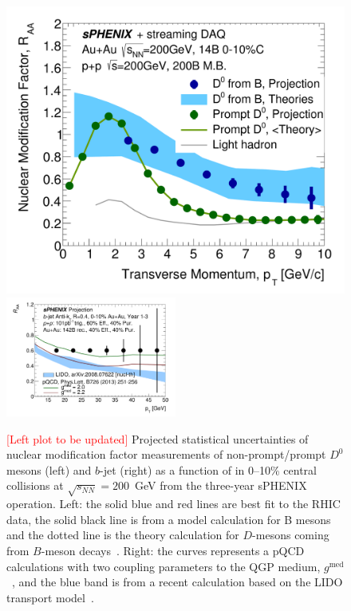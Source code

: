 \begin{figure}[htbp]
\centering
\includegraphics[width=.49\linewidth]{figs/RAA_DB_theory_root_RAADB_pp200B.pdf}
\includegraphics[width=0.5\textwidth]{figs/200pp_pythia8_CTEQ6L_7GeV_ALL_cfg_eneg_DSTReader_root_Draw_HFJetTruth_CrossSection2RAA_Theory_3yr_deta0_70.pdf}
\caption{{\textcolor{red}{[Left plot to be updated]}} Projected statistical uncertainties of nuclear modification factor \raa measurements of non-prompt/prompt $D^0$ mesons (left) and $b$-jet (right) as a function of \pT in 0--10\% central \auau collisions at $\sqrt{s_{NN}}=200$~GeV from the three-year sPHENIX operation. Left: the solid blue and red lines are best fit to the RHIC data, the solid black line is from a model calculation for B mesons and the dotted line is the theory calculation for $D$-mesons coming from $B$-meson decays~\cite{Duke,TAMU,PHSD,CUJET}. Right: the curves represents a pQCD calculations with two coupling parameters to the QGP medium, $g^{\textrm{med}}$~\cite{Huang:2013vaa}, and the blue band is from a recent calculation based on the LIDO transport model~\cite{Ke:2020nsm}. }
\label{fig:HF-inclusive-RAA}
\end{figure}

